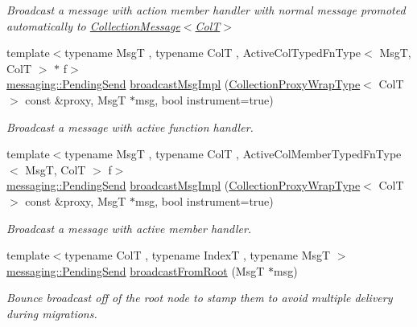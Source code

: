 \begin{DoxyCompactItemize}
\begin{DoxyCompactList}\small\item\em Broadcast a message with action member handler with normal message promoted automatically to {\ttfamily \hyperlink{structvt_1_1vrt_1_1collection_1_1_collection_message}{Collection\+Message$<$\+Col\+T$>$}} \end{DoxyCompactList}\item 
{\footnotesize template$<$typename MsgT , typename ColT , Active\+Col\+Typed\+Fn\+Type$<$ Msg\+T, Col\+T $>$ $\ast$ f$>$ }\\\hyperlink{structvt_1_1messaging_1_1_pending_send}{messaging\+::\+Pending\+Send} \hyperlink{structvt_1_1vrt_1_1collection_1_1_collection_manager_ac7a9c72784d76ddf0346926bbb147e8c}{broadcast\+Msg\+Impl} (\hyperlink{structvt_1_1vrt_1_1collection_1_1_collection_manager_a56458ed7f9bb22b631b9b3a745f42f94}{Collection\+Proxy\+Wrap\+Type}$<$ ColT $>$ const \&proxy, MsgT $\ast$msg, bool instrument=true)
\begin{DoxyCompactList}\small\item\em Broadcast a message with active function handler. \end{DoxyCompactList}\item 
{\footnotesize template$<$typename MsgT , typename ColT , Active\+Col\+Member\+Typed\+Fn\+Type$<$ Msg\+T, Col\+T $>$ f$>$ }\\\hyperlink{structvt_1_1messaging_1_1_pending_send}{messaging\+::\+Pending\+Send} \hyperlink{structvt_1_1vrt_1_1collection_1_1_collection_manager_ac7a9c72784d76ddf0346926bbb147e8c}{broadcast\+Msg\+Impl} (\hyperlink{structvt_1_1vrt_1_1collection_1_1_collection_manager_a56458ed7f9bb22b631b9b3a745f42f94}{Collection\+Proxy\+Wrap\+Type}$<$ ColT $>$ const \&proxy, MsgT $\ast$msg, bool instrument=true)
\begin{DoxyCompactList}\small\item\em Broadcast a message with active member handler. \end{DoxyCompactList}\item 
{\footnotesize template$<$typename ColT , typename IndexT , typename MsgT $>$ }\\\hyperlink{structvt_1_1messaging_1_1_pending_send}{messaging\+::\+Pending\+Send} \hyperlink{structvt_1_1vrt_1_1collection_1_1_collection_manager_a53567bdf285983b92dd4094721f8a4fd}{broadcast\+From\+Root} (MsgT $\ast$msg)
\begin{DoxyCompactList}\small\item\em Bounce broadcast off of the root node to stamp them to avoid multiple delivery during migrations. \end{DoxyCompactList}\item 

\end{DoxyCompactItemize}
